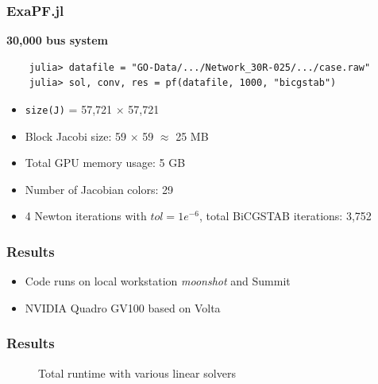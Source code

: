 \begin{frame}[fragile]
  \frametitle{ExaPF.jl}
  {\bf 30,000 bus system}
  \begin{lstlisting}
    julia> datafile = "GO-Data/.../Network_30R-025/.../case.raw"
    julia> sol, conv, res = pf(datafile, 1000, "bicgstab")
  \end{lstlisting}
  \begin{itemize}
    \item \lstinline{size(J)} = 57,721 $\times$ 57,721 
    \item Block Jacobi size: 59 $\times$ 59 $\approx$ 25 MB
    \item Total GPU memory usage: 5 GB
    \item Number of Jacobian colors: 29
    \item 4 Newton iterations with $tol = 1e^{-6}$, total BiCGSTAB iterations: 3,752 
  \end{itemize}
\end{frame}

\begin{frame}
  \frametitle{Results}
  \begin{itemize}
    \item Code runs on local workstation {\it moonshot} and Summit
    \item NVIDIA Quadro GV100 based on Volta 
  \end{itemize}
\end{frame}

\begin{frame}[fragile]
  \frametitle{Results}
  \begin{figure}
\caption{Total runtime with various linear solvers}
\label{fig:totalruntime}
\end{figure}
\end{frame}


